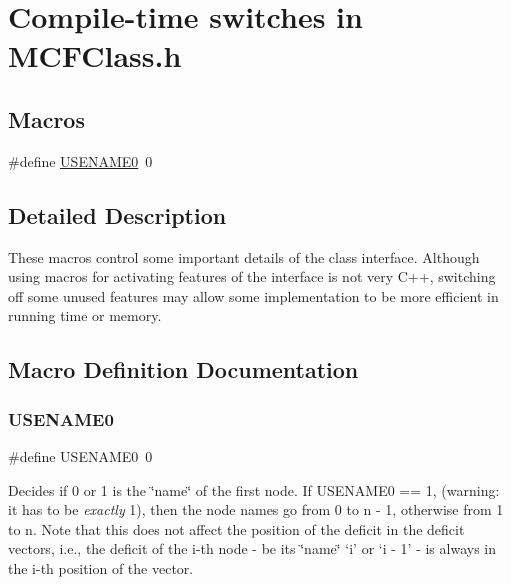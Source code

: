 \hypertarget{group___m_c_f_c_l_a_s_s___m_a_c_r_o_s}{}\section{Compile-\/time switches in M\+C\+F\+Class.\+h}
\label{group___m_c_f_c_l_a_s_s___m_a_c_r_o_s}
\subsection*{Macros}
\begin{DoxyCompactItemize}
\item 
\#define \mbox{\hyperlink{group___m_c_f_c_l_a_s_s___m_a_c_r_o_s_ga74cc96ffa32533b7eff040b5ffee5e06}{U\+S\+E\+N\+A\+M\+E0}}~0
\end{DoxyCompactItemize}


\subsection{Detailed Description}
These macros control some important details of the class interface. Although using macros for activating features of the interface is not very C++, switching off some unused features may allow some implementation to be more efficient in running time or memory. 

\subsection{Macro Definition Documentation}
\mbox{\label{group___m_c_f_c_l_a_s_s___m_a_c_r_o_s_ga74cc96ffa32533b7eff040b5ffee5e06}} 
\subsubsection{\texorpdfstring{U\+S\+E\+N\+A\+M\+E0}{USENAME0}}
{\footnotesize\ttfamily \#define U\+S\+E\+N\+A\+M\+E0~0}

Decides if 0 or 1 is the \char`\"{}name\char`\"{} of the first node. If U\+S\+E\+N\+A\+M\+E0 == 1, (warning\+: it has to be {\itshape exactly} 1), then the node names go from 0 to n -\/ 1, otherwise from 1 to n. Note that this does not affect the position of the deficit in the deficit vectors, i.\+e., the deficit of the i-\/th node -\/ be its \char`\"{}name\char`\"{} `i' or `i -\/ 1' -\/ is always in the i-\/th position of the vector. 